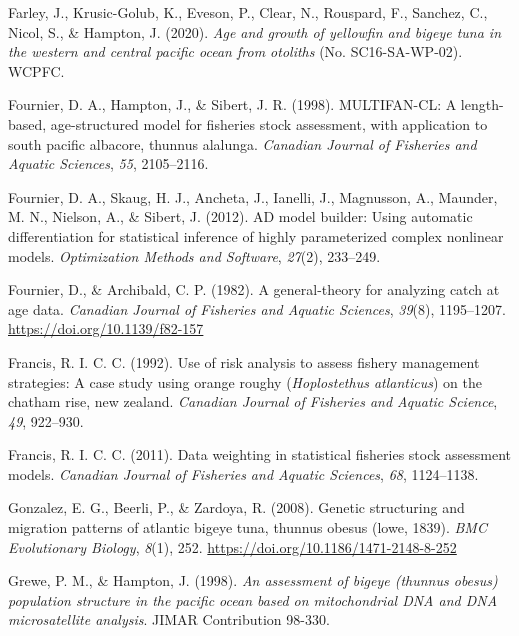 \documentclass[
  english,
  a4paper,
  a4paper,
  11pt]{SCreport}
\newlength{\cslhangindent}
\newenvironment{CSLReferences}[2] %
 {\begin{list}{}{%
  \setlength{\itemindent}{0pt}
  \setlength{\leftmargin}{0pt}
  \setlength{\parsep}{0pt}
  \ifodd #1
   \setlength{\leftmargin}{\cslhangindent}
   \setlength{\itemindent}{-1\cslhangindent}
  \fi
  \setlength{\itemsep}{#2\baselineskip}}}
 {\end{list}}
\begin{document}
\begin{CSLReferences}{1}{0}
Farley, J., Krusic-Golub, K., Eveson, P., Clear, N., Rouspard, F.,
Sanchez, C., Nicol, S., \& Hampton, J. (2020). \emph{Age and growth of
yellowfin and bigeye tuna in the western and central pacific ocean from
otoliths} (No. {SC}16-{SA}-{WP}-02). WCPFC.

Fournier, D. A., Hampton, J., \& Sibert, J. R. (1998). {MULTIFAN}-{CL}:
A length-based, age-structured model for fisheries stock assessment,
with application to south pacific albacore, thunnus alalunga.
\emph{Canadian Journal of Fisheries and Aquatic Sciences}, \emph{55},
2105--2116.

Fournier, D. A., Skaug, H. J., Ancheta, J., Ianelli, J., Magnusson, A.,
Maunder, M. N., Nielson, A., \& Sibert, J. (2012). {AD} model builder:
Using automatic differentiation for statistical inference of highly
parameterized complex nonlinear models. \emph{Optimization Methods and
Software}, \emph{27}(2), 233--249.

Fournier, D., \& Archibald, C. P. (1982). A general-theory for analyzing
catch at age data. \emph{Canadian Journal of Fisheries and Aquatic
Sciences}, \emph{39}(8), 1195--1207.
\url{https://doi.org/10.1139/f82-157}

Francis, R. I. C. C. (1992). Use of risk analysis to assess fishery
management strategies: A case study using orange roughy
({\emph{Hoplostethus atlanticus}}) on the chatham rise, new zealand.
\emph{Canadian Journal of Fisheries and Aquatic Science}, \emph{49},
922--930.

Francis, R. I. C. C. (2011). Data weighting in statistical fisheries
stock assessment models. \emph{Canadian Journal of Fisheries and Aquatic
Sciences}, \emph{68}, 1124--1138.

Gonzalez, E. G., Beerli, P., \& Zardoya, R. (2008). Genetic structuring
and migration patterns of atlantic bigeye tuna, thunnus obesus (lowe,
1839). \emph{{BMC} Evolutionary Biology}, \emph{8}(1), 252.
\url{https://doi.org/10.1186/1471-2148-8-252}

Grewe, P. M., \& Hampton, J. (1998). \emph{An assessment of bigeye
(thunnus obesus) population structure in the pacific ocean based on
mitochondrial {DNA} and {DNA} microsatellite analysis}. {JIMAR}
Contribution 98-330.


\end{CSLReferences}
\end{document}
